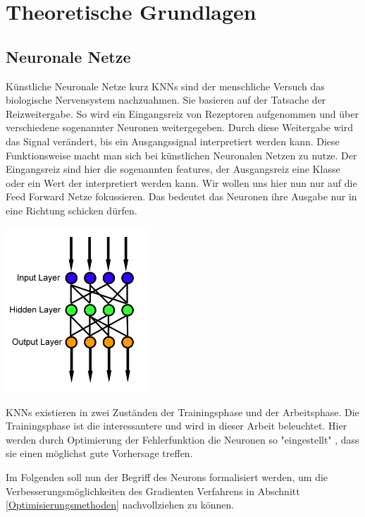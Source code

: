 
\section{Theoretische Grundlagen}\label{Theoretische Grundlagen}


\subsection{Neuronale Netze}\label{Neuronale Netze}

Künstliche Neuronale Netze kurz KNNs sind der menschliche
Versuch das biologische Nervensystem nachzuahmen.
Sie basieren auf der Tatsache der Reizweitergabe. 
So wird ein Eingangsreiz von Rezeptoren aufgenommen 
und über verschiedene sogenannter Neuronen weitergegeben.
Durch diese Weitergabe wird das Signal verändert,
bis ein Ausgangssignal interpretiert werden kann. 
Diese Funktionsweise macht man sich bei künstlichen
Neuronalen Netzen zu nutze.
Der Eingangsreiz sind hier 
die sogenannten \grqq features\grqq{}, 
der Ausgangsreiz eine Klasse oder ein Wert
der interpretiert werden kann.
Wir wollen uns hier nun nur auf die \grqq Feed Forward\grqq{}
Netze fokussieren. Das bedeutet das Neuronen ihre Ausgabe
nur in eine Richtung schicken dürfen.


\begin{center}
 \includegraphics[width=0.4\textwidth]{abb/Feed_forward_neural_net.png}
\end{center}


KNNs existieren in zwei Zuständen der Trainingsphase
und der Arbeitsphase. 
Die Trainingsphase ist die interessantere und wird in
dieser Arbeit beleuchtet. Hier werden durch Optimierung 
der Fehlerfunktion die Neuronen so "eingestellt" ,
dass sie einen möglichst gute Vorhersage treffen. 

Im Folgenden soll nun der Begriff des Neurons formalisiert 
werden, um die Verbesserungsmöglichkeiten des Gradienten
Verfahrens in Abschnitt \ref{Optimisierungsmethoden} 
nachvollziehen zu können.

